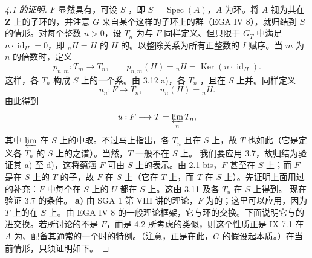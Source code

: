 \begin{proof}[ 4.1 的证明]
 $F$ 显然具有，可设 $S$ ，即 $S=\operatorname{Spec}(A)$，$A$ 为环。将 $A$ 视为其在 $\mathbf Z$ 上的子环的，并注意 $G$ 来自某个这样的子环上的群（EGA IV 8），就归结到 $S$ 的情形。对每个整数 $n>0$，设 $T_n$ 为与 $F$ 同样定义、但只限于 $G_T$ 中满足 $n\cdot\operatorname{id}_H=0$，即 ${}_nH=H$ 的 $H$ 的。以整除关系为所有正整数的 $I$ 赋序。当 $m$ 为 $n$ 的倍数时，定义
\[p_{n,m}:T_m\longrightarrow T_n,\qquad p_{n,m}(H)={}_nH=\operatorname{Ker}(n\cdot\operatorname{id}_H).\]
这样，各 $T_n$ 构成 $S$ 上的一个系。由 3.12 a)，各 $T_n$ ，且在 $S$ 上并。同样定义
\[u_n:F\longrightarrow T_n,\qquad u_n(H)={}_nH.\]
由此得到
\[u:F\longrightarrow T=\varprojlim_n T_n,\]
其中 $\varprojlim$ 在 $S$ 上的中取。不过马上指出，各 $T_n$ 且在 $S$ 上，故 $T$ 也如此（它是定义各 $T_n$ 的 $S$ 上的之谱）。当然，$T$ 一般不在 $S$ 上。
我们要应用 3.7，故归结为验证其 a) 至 d)，这将蕴涵 $F$ 可由 $S$ 上的表示。由 2.1 bis，$F$ 甚至在 $S$ 上；而 $F$ 是在 $S$ 上的 $T$ 的子，故 $F$ 在 $S$ 上（它在 $T$ 上，而 $T$ 在 $S$ 上）。先证明上面用过的补充：$F$ 中每个在 $S$ 上的 $U$ 都在 $S$ 上。这由 3.11 及各 $T_u$ 在 $S$ 上得到。
现在验证 3.7 的条件。
\textbf{a)} 由 SGA 1 第 VIII 讲的理论，$F$ 为的；这里可以应用，因为 $T$ 上的在 $S$ 上。由 EGA IV 8 的一般理论框架，它与环的交换。下面说明它与的进交换。若所讨论的不是 $F$，而是 4.2 所考虑的类似，则这个性质正是 IX 7.1 在 $A$ 为、配备其通常的一个时的特例。（注意，正是在此，$G$ 的假设起本质。）在当前情形，只须证明如下。

\end{proof}
